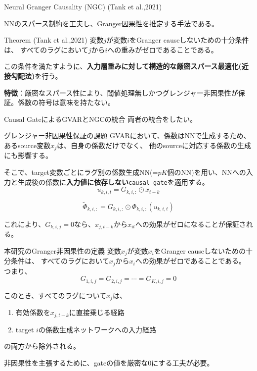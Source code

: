 \documentclass[dvipdfmx,11pt]{beamer}
\begin{document}
\begin{frame}{Neural Granger Causality (NGC) (Tank et al.,2021)}

  NNのスパース制約を工夫し、Granger因果性を推定する手法である。

  \vspace{0.5em}
  \begin{block}{Theorem (Tank et al.,2021)}
    変数$j$が変数$i$をGranger causeしないための十分条件は、
    すべてのラグにおいて$j$から$i$への重みがゼロであることである。
  \end{block}
  この条件を満たすように、\textbf{入力層重みに対して構造的な厳密スパース最適化(近接勾配法)}を行う。

  \vspace{1.0em}

  \begin{center}
    \textbf{特徴}：厳密なスパース性により、閾値処理無しかつグレンジャー非因果性が保証。係数の符号は意味を持たない。
  \end{center}
\end{frame}

\begin{frame}{Causal GateによるGVARとNGCの統合}
  両者の統合をしたい。
  \begin{block}{グレンジャー非因果性保証の課題}
    GVARにおいて、係数はNNで生成するため、あるsource変数$x_j$は、自身の係数だけでなく、
    他のsourceに対応する係数の生成にも影響する。
  \end{block}


  \vspace{0.5em}
  そこで、target変数ごとにラグ別の係数生成NN(=$pK$個のNN)を用い、NNへの入力と生成後の係数に\textbf{入力値に依存しない}\texttt{causal\_gate}を適用する。
  \[
    u_{k,i,t}=G_{k,i,:}\odot x_{t-k}
  \]

  \[
    \tilde{\Phi}_{k,i,:}
    =
    G_{k,i,:}\odot \Phi_{k,i,:}(u_{k,i,t})
  \]

  \vspace{0.3em}
  これにより、$G_{k,i,j}=0$なら、$x_{j,t-k}$から$x_{it}$への効果がゼロになることが保証される。
\end{frame}

\begin{frame}{本研究のGranger非因果性の定義}
  変数$x_j$が変数$x_i$をGranger causeしないための十分条件は、
  すべてのラグにおいて$x_j$から$x_i$への効果がゼロであることである。
  つまり、
  \[
    G_{1,i,j} = G_{2,i,j} = \cdots = G_{K,i,j} = 0
  \]

  このとき、すべてのラグについて$x_j$は、

  \begin{enumerate}
    \item 有効係数を$x_{j,t-k}$に直接乗じる経路
    \item target $i$の係数生成ネットワークへの入力経路
  \end{enumerate}

  の両方から除外される。

非因果性を主張するために、gateの値を厳密な0にする工夫が必要。
\end{frame}
\end{document}
